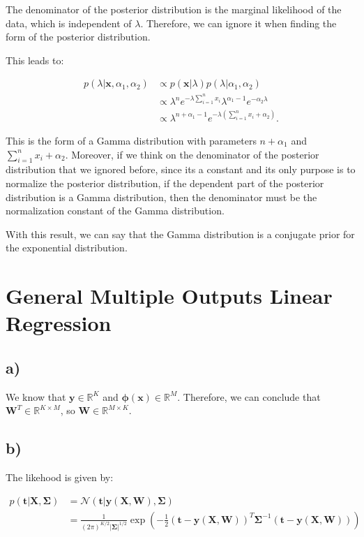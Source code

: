 \documentclass[12pt,a4paper,oneside]{paper}
\begin{document}
The denominator of the posterior distribution is the marginal likelihood of the data, which is independent of \( \lambda \). Therefore, we can ignore it when finding the form of the posterior distribution.

This leads to: 

\begin{align*}
p(\lambda | \mathbf{x}, \alpha_1, \alpha_2) &\propto p(\mathbf{x} | \lambda) p(\lambda | \alpha_1, \alpha_2) \\
&\propto \lambda^n e^{-\lambda \sum_{i=1}^{n} x_i} \lambda^{\alpha_1 - 1} e^{-\alpha_2 \lambda} \\
&\propto \lambda^{n + \alpha_1 - 1} e^{-\lambda \left( \sum_{i=1}^{n} x_i + \alpha_2 \right)}.
\end{align*}

This is the form of a Gamma distribution with parameters \( n + \alpha_1 \) and \( \sum_{i=1}^{n} x_i + \alpha_2 \).
Moreover, if we think on the denominator of the posterior distribution that we ignored before, since its a constant
and its only purpose is to normalize the posterior distribution, if the dependent part of the posterior distribution is a Gamma distribution, then the denominator must be the normalization constant of the Gamma distribution.

With this result, we can say that the Gamma distribution is a conjugate prior for the exponential distribution.

\newpage
\section{General Multiple Outputs Linear Regression }

\subsection*{a)}

We know that $\bm{y} \in \mathbb{R}^K$ and $\bm{\phi(\mathbf{x})} \in \mathbb{R}^M$. Therefore, we can conclude
that $\mathbf{W}^T \in \mathbb{R}^{K \times M}$, so $\mathbf{W} \in \mathbb{R}^{M \times K}$.

\subsection*{b)}

The likehood is given by: 

\begin{align*}
p(\mathbf{t} | \mathbf{X}, \mathbf{\Sigma}) &= \mathcal{N} \left( \mathbf{t} | \mathbf{y}(\mathbf{X}, \mathbf{W}), \mathbf{\Sigma} \right) \\
&= \frac{1}{(2\pi)^{K/2} |\mathbf{\Sigma}|^{1/2}} \exp \left( -\frac{1}{2} (\mathbf{t} - \mathbf{y}(\mathbf{X}, \mathbf{W}))^T \mathbf{\Sigma}^{-1} (\mathbf{t} - \mathbf{y}(\mathbf{X}, \mathbf{W})) \right) \\
\end{align*}
\end{document}
